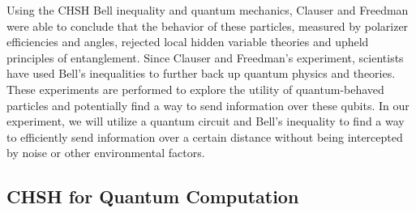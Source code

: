 \documentclass[a4paper, onecolumn, 11pt, titlepage]{quantumarticle}
\begin{document}
Using the CHSH Bell inequality and quantum mechanics, Clauser and Freedman were able to conclude that the behavior of these particles, measured by polarizer efficiencies and angles, rejected local hidden variable theories and upheld principles of entanglement. 
Since Clauser and Freedman’s experiment, scientists have used Bell’s inequalities to further back up quantum physics and theories. These experiments are performed to explore the utility of quantum-behaved particles and potentially find a way to send information over these qubits. In our experiment, we will utilize a quantum circuit and Bell’s inequality to find a way to efficiently send information over a certain distance without being intercepted by noise or other environmental factors. 


\subsection{CHSH for Quantum Computation}



\end{document}
